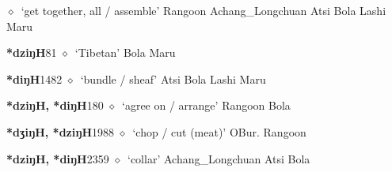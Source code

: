\begin{list}{}{\leftmargin=1.5em \itemindent=-1.5em}
\hspace{1ex}
         $\diamond$~`get together, all / assemble'
         Rangoon 
\hspace{1ex}
         Achang\_Longchuan 
\hspace{1ex}
         Atsi 
\hspace{1ex}
         Bola 
\hspace{1ex}
         Lashi 
\hspace{1ex}
         Maru 
  \item {\footnotesize \textbf{*dziŋH}}{\tiny 81}
\hspace{1ex}
         $\diamond$~`Tibetan'
         Bola 
\hspace{1ex}
         Maru 
  \item {\footnotesize \textbf{*diŋH}}{\tiny 1482}
\hspace{1ex}
         $\diamond$~`bundle / sheaf'
         Atsi 
\hspace{1ex}
         Bola 
\hspace{1ex}
         Lashi 
\hspace{1ex}
         Maru 
  \item {\footnotesize \textbf{*dziŋH, *diŋH}}{\tiny 180}
\hspace{1ex}
         $\diamond$~`agree on / arrange'
         Rangoon 
\hspace{1ex}
         Bola 
  \item {\footnotesize \textbf{*dʒiŋH, *dziŋH}}{\tiny 1988}
\hspace{1ex}
         $\diamond$~`chop / cut (meat)'
         OBur. 
\hspace{1ex}
         Rangoon 
  \item {\footnotesize \textbf{*dziŋH, *diŋH}}{\tiny 2359}
\hspace{1ex}
         $\diamond$~`collar'
         Achang\_Longchuan 
\hspace{1ex}
         Atsi 
\hspace{1ex}
         Bola 
  \end{list}
